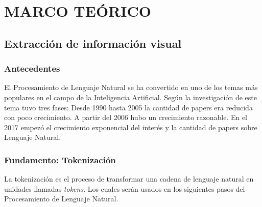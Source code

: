 \documentclass[../main.tex]{subfiles}
\begin{document}
\chapter{MARCO TEÓRICO}


\section{Extracción de información visual}

\subsection{Antecedentes}
El Procesamiento de Lenguaje Natural se ha convertido en uno de los temas más populares en el campo de la Inteligencia Artificial.
Según \citet{CHEN2022100001} la investigación de este tema tuvo tres fases:
Desde 1990 hasta 2005 la cantidad de papers era reducida con poco crecimiento.
A partir del 2006 hubo un crecimiento razonable.
En el 2017 empezó el crecimiento exponencial del interés y la cantidad de papers sobre Lenguaje Natural.

\subsection{Fundamento: Tokenización}

La tokenización es el proceso de transformar una cadena de lenguaje natural en unidades llamadas \emph{tokens}. \cite{Grefenstette1999}
Los cuales serán usados en los siguientes pasos del Procesamiento de Lenguaje Natural.



\end{document}
